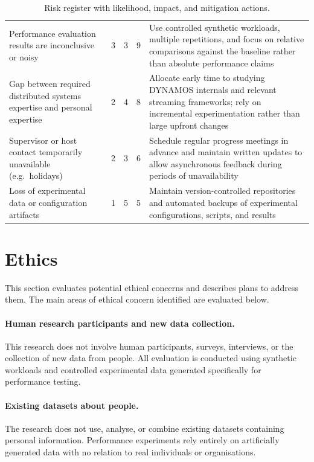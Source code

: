 \documentclass[a4paper,10pt,british]{scrartcl}
\begin{document}
\begin{table}[H]
\begin{tabular}{@{}p{}cccp{}@{}}
  Performance evaluation results are inconclusive or noisy
    & 3 & 3 & 9
    & Use controlled synthetic workloads, multiple repetitions, and focus on relative comparisons against the baseline rather than absolute performance claims \\

  Gap between required distributed systems expertise and personal expertise
    & 2 & 4 & 8
    & Allocate early time to studying DYNAMOS internals and relevant streaming frameworks; rely on incremental experimentation rather than large upfront changes \\

  Supervisor or host contact temporarily unavailable (e.g.\ holidays)
    & 2 & 3 & 6
    & Schedule regular progress meetings in advance and maintain written updates to allow asynchronous feedback during periods of unavailability \\

  Loss of experimental data or configuration artifacts
    & 1 & 5 & 5
    & Maintain version-controlled repositories and automated backups of experimental configurations, scripts, and results \\

  \bottomrule
\end{tabular}
\caption{Risk register with likelihood, impact, and mitigation actions.}
\label{tab:risk-register}
\end{table}

\section{Ethics}
This section evaluates potential ethical concerns and describes plans to address them. The main areas of ethical concern identified are evaluated below.

\paragraph{Human research participants and new data collection.}
This research does not involve human participants, surveys, interviews, or the collection of new data from people. All evaluation is conducted using synthetic workloads and controlled experimental data generated specifically for performance testing.

\paragraph{Existing datasets about people.}
The research does not use, analyse, or combine existing datasets containing personal information. Performance experiments rely entirely on artificially generated data with no relation to real individuals or organisations.
\end{document}
